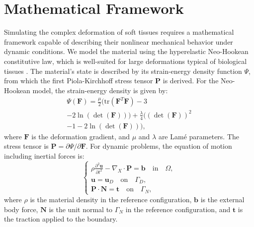 \documentclass[11pt,a4paper,twocolumn]{article}
\begin{document}
\section{Mathematical Framework}
\label{sec:es:mathematical_framework}

Simulating the complex deformation of soft tissues requires a mathematical framework capable of describing their nonlinear mechanical behavior under dynamic conditions. We model the material using the hyperelastic Neo-Hookean constitutive law, which is well-suited for large deformations typical of biological tissues \cite{Ogden_1997}. The material's state is described by its strain-energy density function $\Psi$, from which the first Piola-Kirchhoff stress tensor $\bm{P}$ is derived. For the Neo-Hookean model, the strain-energy density is given by:
\begin{equation}
\begin{split}
        \Psi(\bm{F}) = \frac{\mu}{2} (\text{tr}(\bm{F}^T\bm{F}) - 3 \\- 2\ln(\det(\bm{F}))) + \frac{\lambda}{4} ((\det(\bm{F}))^2\\ - 1 - 2\ln(\det(\bm{F}))),
\end{split}
\label{eq:es:neo_hookean_energy}
\end{equation}
where $\bm{F}$ is the deformation gradient, and $\mu$ and $\lambda$ are Lamé parameters. The stress tensor is $\bm{P} = \partial \Psi / \partial \bm{F}$. For dynamic problems, the equation of motion including inertial forces is:
\begin{equation}
    \begin{cases}
        \rho \frac{\partial^2 \bm{u}}{\partial t^2} - \nabla_X \cdot \bm{P} = \bm{b} \quad \text{in} \quad \Omega, \\
        \bm{u} = \bm{u}_D \quad \text{on} \quad \Gamma_D, \\
        \bm{P} \cdot \bm{N} = \bm{t} \quad \text{on} \quad \Gamma_N,
    \end{cases}
\label{eq:dynamic_problem}
\end{equation}
where $\rho$ is the material density in the reference configuration, $\bm{b}$ is the external body force, $\bm{N}$ is the unit normal to $\Gamma_N$ in the reference configuration, and $\bm{t}$ is the traction applied to the boundary.
\end{document}
